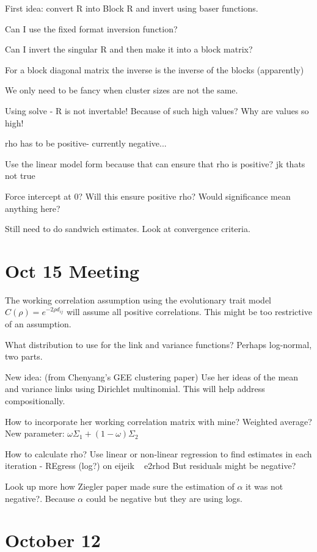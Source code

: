 \documentclass[10pt]{article}
\begin{document}
First idea: convert R into Block R and invert using baser functions.

Can I use the fixed format inversion function?

Can I invert the singular R and then make it into a block matrix?

For a block diagonal matrix the inverse is the inverse of the blocks (apparently)

We only need to be fancy when cluster sizes are not the same.


Using solve - R is not invertable! Because of such high values?
Why are values so high!

rho has to be positive- currently negative...

Use the linear model form because that can ensure that rho is positive? jk thats not true

Force intercept at 0? Will this ensure positive rho?
Would significance mean anything here?


Still need to do sandwich estimates.
Look at convergence criteria.


\section{Oct 15 Meeting}

The working correlation assumption using the evolutionary trait model $C(\rho) = e^{-2\rho d_{ij}}$ will assume all positive correlations. This might be too restrictive of an assumption.

What distribution to use for the link and variance functions? Perhaps log-normal, two parts.

New idea: (from Chenyang's GEE clustering paper) Use her ideas of the mean and variance links using Dirichlet multinomial. This will help address compositionally.

How to incorporate her working correlation matrix with mine? Weighted average? New parameter: $\omega \Sigma_1 + (1 - \omega)\Sigma_2$

How to calculate rho? Use linear or non-linear regression to find estimates in each iteration
- REgress (log?) on eijeik ~ e2rhod
But residuals might be negative?

Look up more how Ziegler paper made sure the estimation of $\alpha$ it was not negative?. Because $\alpha$ could be negative but they are using logs.



\section{October 12}
\end{document}
